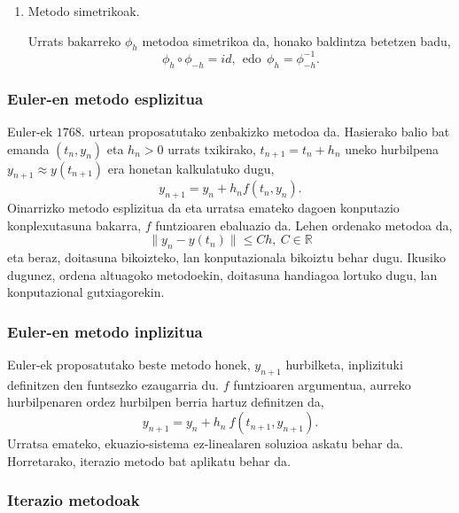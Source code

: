 \begin{enumerate}
\begin{enumerate}
\end{enumerate}

\item  Metodo simetrikoak.

Urrats bakarreko $\phi_h$ metodoa simetrikoa da, honako baldintza betetzen badu,
\begin{equation*}
\phi_h \circ \phi_{-h}=id,  \ \ \text{edo} \ \ \phi_h=\phi_{-h}^{-1}.
\end{equation*}


\end{enumerate}


\subsubsection*{Euler-en metodo esplizitua}

Euler-ek $1768.$ urtean proposatutako zenbakizko metodoa da. Hasierako balio bat emanda $(t_n,y_n)$ eta $h_n>0$ urrats txikirako, $t_{n+1}=t_{n}+h_{n}$ uneko hurbilpena $y_ {n+1} \approx y(t_{n+1})$ era honetan kalkulatuko dugu,  
\begin{equation*}
 \label{eq:202a}
y_{n+1}=y_{n}+h_n f(t_n,y_n).
\end{equation*}
Oinarrizko metodo esplizitua da eta urratsa emateko dagoen konputazio konplexutasuna bakarra, $f$ funtzioaren ebaluazio da. Lehen ordenako metodoa da,
\begin{equation*}
\|y_n-y(t_n)\| \leqslant C h, \ C \in \mathbb{R}
\end{equation*}
eta beraz, doitasuna bikoizteko, lan konputazionala bikoiztu behar dugu. Ikusiko dugunez, ordena altuagoko metodoekin, doitasuna handiagoa lortuko dugu, lan konputazional gutxiagorekin. 

\subsubsection*{Euler-en metodo inplizitua}

Euler-ek proposatutako beste metodo honek, $y_{n+1}$ hurbilketa, inplizituki definitzen den funtsezko ezaugarria du. $f$ funtzioaren argumentua, aurreko hurbilpenaren ordez hurbilpen berria hartuz definitzen da,
\begin{equation*}
 \label{eq:202b}
y_{n+1}=y_{n}+h_n \ f(t_{n+1},y_{n+1}).
\end{equation*}
Urratsa emateko, ekuazio-sistema ez-linealaren soluzioa askatu behar da. Horretarako, iterazio metodo bat aplikatu behar da.

\subsubsection*{Iterazio metodoak}

